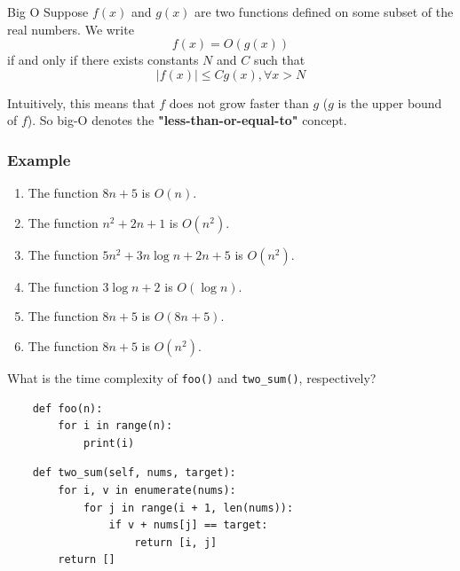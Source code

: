 \documentclass[aspectratio=169, 14pt]{beamer}
\begin{document}
\begin{frame}

	\begin{exampleblock}{Big O}
		Suppose $f(x)$ and $g(x)$ are two functions defined on some subset of the real numbers. We write
		\[f(x) = O(g(x))\]
		if and only if there exists constants $N$ and $C$ such that
		\[|f(x)| \leq Cg(x), \forall x > N\]
	\end{exampleblock}

	Intuitively, this means that $f$ does not grow faster than $g$ ($g$ is the \alert{upper bound} of $f$). So big-O denotes the \textbf{"less-than-or-equal-to"} concept.

\end{frame}


\begin{frame}[fragile]
	\frametitle{Example}
	\begin{enumerate}
		\item The function $8n + 5$ is $O(n)$.
		\item The function $n^2 + 2n + 1$ is $O(n^2)$.
		\item The function $5n^2 + 3n\log{n} + 2n + 5$ is $O(n^2)$.
		\item The function $3\log{n} + 2$ is $O(\log{n})$.
		\item The function $8n + 5$ is $O(8n + 5)$.
		\item The function $8n + 5$ is $O(n^2)$.
	\end{enumerate}
	\pause

\end{frame}

\begin{frame}[fragile]

	{\large {}} What is the time complexity of \texttt{foo()} and \texttt{two\_sum()}, respectively?
	\begin{verbatim}
    def foo(n):
        for i in range(n):
            print(i)
    \end{verbatim}

	\begin{verbatim}
    def two_sum(self, nums, target):
        for i, v in enumerate(nums):
            for j in range(i + 1, len(nums)):
                if v + nums[j] == target:
                    return [i, j]
        return []
    \end{verbatim}
\end{frame}
\end{document}
